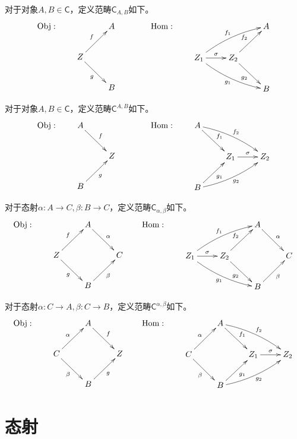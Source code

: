 \begin{example}
	对于对象$A,B\in\mathsf{C}$，定义范畴$\mathsf{C}_{A,B}$如下。
	$$
	\mathrm{Obj}:\qquad
	\xymatrix{
		& A \\
		Z\ar[ur]^f \ar[dr]_g \\
		& B
	}
	\qquad\qquad 
	\mathrm{Hom}:\qquad
	\xymatrix{
		& &A \\
		Z_1 \ar[r]^{\sigma} \ar@/^/[urr]^{f_1} \ar@/_/[drr]_{g_1} & Z_2 \ar[ur]^{f_2} \ar[dr]_{g_2} \\
		& &B
	}
	$$
	
	对于对象$A,B\in\mathsf{C}$，定义范畴$\mathsf{C}^{A,B}$如下。
	$$
	\mathrm{Obj}:\qquad
	\xymatrix{
		A \ar[dr]^f&\\
		&Z  \\
		B \ar[ur]_g&
	}
	\qquad\qquad 
	\mathrm{Hom}:\qquad
	\xymatrix{
		A \ar[dr]^{f_1} \ar@/^/[drr]^{f_2} & & \\
		& Z_1 \ar[r]^\sigma & Z_2 \\
		B \ar[ur]_{g_1} \ar@/_/[urr]_{g_2} & & \\
	}
	$$
\end{example}

\begin{example}
	对于态射$\alpha:A\to C,\beta:B\to C$，定义范畴$\mathsf{C}_{\alpha,\beta}$如下。
	$$
	\mathrm{Obj}:\qquad
	\xymatrix{
		& A \ar[dr]^\alpha \\
		Z\ar[ur]^f \ar[dr]_g & & C\\
		& B \ar[ur]_\beta
	}
	\qquad 
	\mathrm{Hom}:\qquad
	\xymatrix{
		& &A \ar[dr]^\alpha\\
		Z_1 \ar[r]^{\sigma} \ar@/^/[urr]^{f_1} \ar@/_/[drr]_{g_1} & Z_2 \ar[ur]^{f_2} \ar[dr]_{g_2} & & C\\
		& &B \ar[ur]_\beta
	}
	$$
	
	对于态射$\alpha:C\to A,\beta:C\to B$，定义范畴$\mathsf{C}^{\alpha,\beta}$​如下。
	$$
	\mathrm{Obj}:\qquad
	\xymatrix{
		& A \ar[dr]^f \\
		C\ar[ur]^\alpha \ar[dr]_\beta & & Z\\
		& B \ar[ur]_g
	}
	\qquad 
	\mathrm{Hom}:\qquad
	\xymatrix{
		& A \ar[dr]^{f_1} \ar@/^/[rrd]^{f_2} & & \\
		C \ar[ur]^\alpha \ar[dr]_\beta & & Z_1 \ar[r]^\sigma & Z_2 \\
		& B \ar[ur]_{g_1} \ar@/_/[rru]_{g_2} & & \\
	}
	$$
\end{example}

\section{态射}

